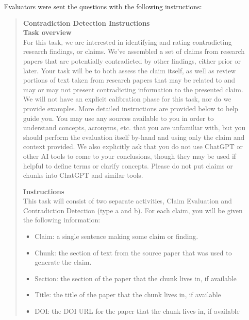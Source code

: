 Evaluators were sent the questions with the following instructions:  \\
\begin{quote}
\textbf{Contradiction Detection Instructions} \\
\textbf{Task overview}\\ 
For this task, we are interested in identifying and rating contradicting research findings, or claims. We’ve assembled a set of claims from research papers that are potentially contradicted by other findings, either prior or later. Your task will be to both assess the claim itself, as well as review portions of text taken from research papers that may be related to and may or may not present contradicting information to the presented claim.
We will not have an explicit calibration phase for this task, nor do we provide examples. More detailed instructions are provided below to help guide you. You may use any sources available to you in order to understand concepts, acronyms, etc. that you are unfamiliar with, but you should perform the evaluation itself by-hand and using only the claim and context provided.
We also explicitly ask that you do not use ChatGPT or other AI tools to come to your conclusions, though they may be used if helpful to define terms or clarify concepts. Please do not put claims or chunks into ChatGPT and similar tools.

\textbf{Instructions}\\
This task will consist of two separate activities, Claim Evaluation and Contradiction Detection (type a and b). For each claim, you will be given the following information:
\begin{itemize}
    \item Claim: a single sentence making some claim or finding.
    \item Chunk: the section of text from the source paper that was used to generate the claim.
    \item Section: the section of the paper that the chunk lives in, if available
    \item Title: the title of the paper that the chunk lives in, if available
    \item DOI: the DOI URL for the paper that the chunk lives in, if available
\end{itemize}


\end{quote}
